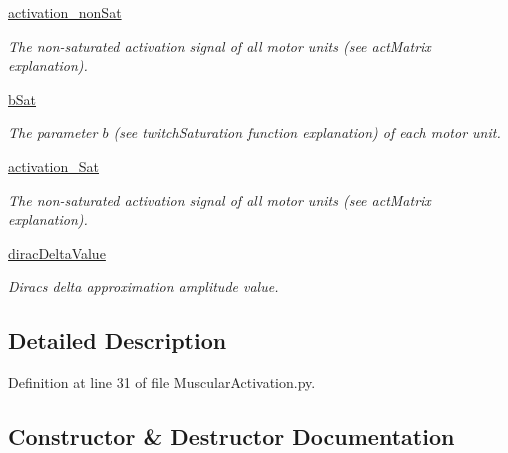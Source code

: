 \begin{DoxyCompactItemize}
\hyperlink{class_muscular_activation_1_1_muscular_activation_ae0b34b99d9fdd1d309ff086512d299dd}{activation\+\_\+non\+Sat}
\begin{DoxyCompactList}\small\item\em The non-\/saturated activation signal of all motor units (see act\+Matrix explanation). \end{DoxyCompactList}\item 
\hyperlink{class_muscular_activation_1_1_muscular_activation_a7dc6db96d1ac7a6bbef7dfa631215756}{b\+Sat}
\begin{DoxyCompactList}\small\item\em The parameter $b$ (see twitch\+Saturation function explanation) of each motor unit. \end{DoxyCompactList}\item 
\hyperlink{class_muscular_activation_1_1_muscular_activation_aab99ef4f19e7af03fccc71d7dc3571d1}{activation\+\_\+\+Sat}
\begin{DoxyCompactList}\small\item\em The non-\/saturated activation signal of all motor units (see act\+Matrix explanation). \end{DoxyCompactList}\item 
\hyperlink{class_muscular_activation_1_1_muscular_activation_afd716e50c9182ca4676c4b84a0f3dd49}{dirac\+Delta\+Value}
\begin{DoxyCompactList}\small\item\em Dirac\textquotesingle{}s delta approximation amplitude value. \end{DoxyCompactList}\end{DoxyCompactItemize}


\subsection{Detailed Description}


Definition at line 31 of file Muscular\+Activation.\+py.



\subsection{Constructor \& Destructor Documentation}
